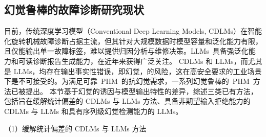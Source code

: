 \subsection{幻觉鲁棒的故障诊断研究现状}\label{subsec:fault_diagnosis}

目前，传统深度学习模型（Conventional Deep Learning Models, CDLMs）在智能化旋转机械故障诊断占据主流，但其针对大规模数据时模型容量和泛化能力有限，且仅能输出单一故障标签，难以提供归因分析与维修决策。LLMs~具备强泛化能力和可读诊断报告生成能力，在近年来获得广泛关注。
% 
CDLMs 和 LLMs，而尤其是 LLMs，均存在输出事实性错误，即幻觉，的风险，这在高安全要求的工业场景下是不可接受的。为满足可靠~PHM~的抗幻觉需求，一系列幻觉鲁棒的~PHM~方法已被提出。
本节基于幻觉的诱因与模型输出特性的差异，综述三类已有方法，包括旨在缓解统计偏差的 CDLMs 与 LLMs 方法、具备非期望输入拒绝能力的 CDLMs 与 LLMs 和具有序列级幻觉检测能力的 LLMs。

（1）{缓解统计偏差的 CDLMs 与 LLMs 方法}

